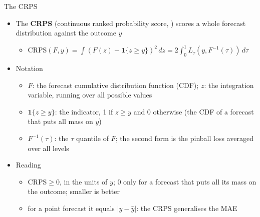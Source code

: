 \begin{frame}{The CRPS}
\itemsize{\footnotesize}
\begin{itemize}
    \item The \textbf{CRPS} (continuous ranked probability score, ) scores a whole forecast distribution against the outcome $y$
    \begin{itemize}
        \item $\text{CRPS}(F, y) = \int (F(z) - \mathbf{1}\{z \ge y\})^2\,dz = 2\int_0^1 L_\tau(y, F^{-1}(\tau))\,d\tau$
    \end{itemize}
    \item Notation
    \begin{itemize}
        \item $F$: the forecast cumulative distribution function (CDF); $z$: the integration variable, running over all possible values
        \item $\mathbf{1}\{z \ge y\}$: the indicator, 1 if $z \ge y$ and 0 otherwise (the CDF of a forecast that puts all mass on $y$)
        \item $F^{-1}(\tau)$: the $\tau$ quantile of $F$; the second form is the pinball loss averaged over all levels
    \end{itemize}
    \item Reading
    \begin{itemize}
        \item $\text{CRPS} \ge 0$, in the units of $y$; 0 only for a forecast that puts all its mass on the outcome; smaller is better
        \item for a point forecast it equals $|y - \hat y|$: the CRPS generalises the MAE
    \end{itemize}
\end{itemize}
\end{frame}

